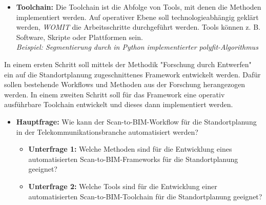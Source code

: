 \begin{German}
\begin{itemize}
        \item \textbf{Toolchain:} Die Toolchain ist die Abfolge von Tools, mit denen die Methoden implementiert werden. Auf operativer Ebene soll technologieabhängig geklärt werden, \textit{WOMIT} die Arbeitsschritte durchgeführt werden. Tools können z. B. Software, Skripte oder Plattformen sein.\\
        \textit{Beispiel: Segmentierung durch in Python implementierter polyfit-Algorithmus}
    \end{itemize}


    In einem ersten Schritt soll mittels der Methodik "Forschung durch Entwerfen" ein auf die Standortplanung zugeschnittenes Framework entwickelt werden. Dafür sollen bestehende Workflows und Methoden aus der Forschung herangezogen werden. In einem zweiten Schritt soll für das Framework eine operativ ausführbare Toolchain entwickelt und dieses dann implementiert werden.


    \begin{itemize}
        \item \textbf{Hauptfrage:} Wie kann der Scan-to-BIM-Workflow für die Standortplanung in der Telekommunikationsbranche automatisiert werden?
        \begin{itemize}
            \item \textbf{Unterfrage 1:} Welche Methoden sind für die Entwicklung eines automatisierten Scan-to-BIM-Frameworks für die Standortplanung geeignet?
            \item \textbf{Unterfrage 2:} Welche Tools sind für die Entwicklung einer automatisierten Scan-to-BIM-Toolchain für die Standortplanung geeignet?
        \end{itemize}
    \end{itemize}
\end{German}

